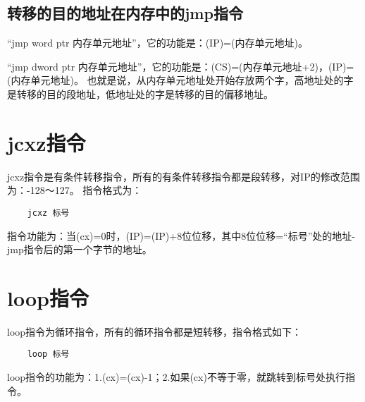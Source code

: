 \documentclass[a4paper,left=2.5cm,right=2.5cm,11pt]{article}
\begin{document}
\subsection{转移的目的地址在内存中的jmp指令}
	“jmp word ptr 内存单元地址”，它的功能是：(IP)=(内存单元地址)。\par

	“jmp dword ptr 内存单元地址”，它的功能是：(CS)=(内存单元地址+2)，(IP)=(内存单元地址)。
	也就是说，从内存单元地址处开始存放两个字，高地址处的字是转移的目的段地址，低地址处的字是转移的目的偏移地址。

\section{jcxz指令}
	jcxz指令是有条件转移指令，所有的有条件转移指令都是段转移，对IP的修改范围为：-128～127。
	指令格式为：
	\begin{lstlisting}
	jcxz 标号
	\end{lstlisting}

	指令功能为：当(cx)=0时，(IP)=(IP)+8位位移，其中8位位移=“标号”处的地址-jmp指令后的第一个字节的地址。

\section{loop指令}
	loop指令为循环指令，所有的循环指令都是短转移，指令格式如下：
	\begin{lstlisting}
	loop 标号
	\end{lstlisting}
	
	loop指令的功能为：1.(cx)=(cx)-1；2.如果(cx)不等于零，就跳转到标号处执行指令。
\end{document}
